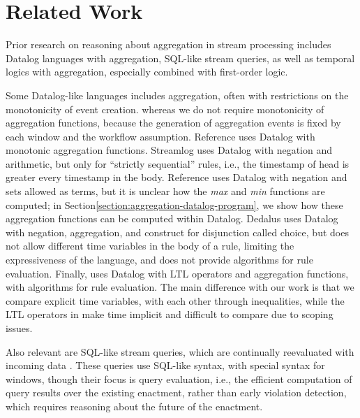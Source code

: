 \section{Related Work}
\label{section:aggregation-related-work}

Prior research on reasoning about aggregation
in stream processing
includes Datalog languages with aggregation,
SQL-like stream queries,
as well as temporal logics with aggregation, especially combined with first-order logic.

Some Datalog-like languages includes aggregation,
often with restrictions on the monotonicity of event creation.
whereas we do not require monotonicity of aggregation functions,
because the generation of aggregation events 
is fixed by each window
and the workflow assumption.
Reference \cite{shkapsky2015optimizing}
uses Datalog with monotonic aggregation functions.
Streamlog \cite{zaniolo2012logical} uses Datalog with negation and arithmetic,
but only for ``strictly sequential'' rules,
i.e., the timestamp of head is greater every timestamp in the body.
Reference \cite{mohapatra2014incremental} uses Datalog with negation and sets allowed as terms,
but it is unclear how the {\em max} and {\em min} functions are computed;
in Section\:\ref{section:aggregation-datalog-program},
we show how these aggregation functions can be computed within Datalog.
Dedalus \cite{alvaro2010dedalus} uses Datalog with negation, aggregation,
and construct for disjunction called choice,
but does not allow different time variables in the body of a rule,
limiting the expressiveness of the language,
and does not provide algorithms for rule evaluation.
Finally, \cite{bellomarini2021monotonic} uses Datalog with LTL operators and aggregation functions,
with algorithms for rule evaluation.
The main difference with our work is that
we compare explicit time variables,
with each other through inequalities,
while the LTL operators in \cite{bellomarini2021monotonic} make time implicit
and difficult to compare due to scoping issues.

Also relevant are SQL-like stream queries,
which are continually reevaluated
with incoming data \cite{arasu2006cql, arasu2016stream}.
These queries use SQL-like syntax,
with special syntax for windows,
though their focus is query evaluation,
i.e., the efficient computation of query results
over the existing enactment,
rather than early violation detection,
which requires reasoning about the future of the enactment.

